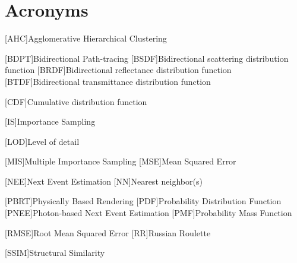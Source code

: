 \newpage
\section*{Acronyms}

\begin{acronym}[ECU]


[AHC]{Agglomerative Hierarchical Clustering}

[BDPT]{Bidirectional Path-tracing}
[BSDF]{Bidirectional scattering distribution function}
[BRDF]{Bidirectional reflectance distribution function}
[BTDF]{Bidirectional transmittance distribution function}

[CDF]{Cumulative distribution function}

[IS]{Importance Sampling}

[LOD]{Level of detail}

[MIS]{Multiple Importance Sampling}
[MSE]{Mean Squared Error}

[NEE]{Next Event Estimation}
[NN]{Nearest neighbor(s)}

[PBRT]{Physically Based Rendering}
[PDF]{Probability Distribution Function}
[PNEE]{Photon-based Next Event Estimation}
[PMF]{Probability Mass Function}

[RMSE]{Root Mean Squared Error}
[RR]{Russian Roulette}

[SSIM]{Structural Similarity}

\end{acronym}
